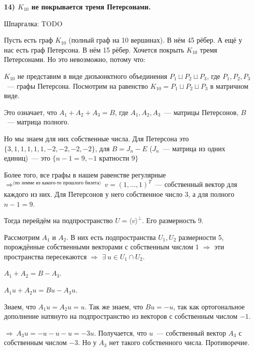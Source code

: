 {\bf 14) $K_{10}$ не покрывается тремя Петерсонами.}

Шпаргалка: TODO

Пусть есть граф $K_{10}$ (полный граф на 10 вершинах). В нём 45 рёбер. А ещё у нас есть граф Петерсона. В нём 15 рёбер. Хочется покрыть $K_{10}$ тремя Петерсонами. Но это невозможно, потому что:

\thrm $K_{10}$ не представим в виде дизъюнктного объединения $P_1\sqcup P_2\sqcup P_3$, где $P_1, P_2, P_3$~--- графы Петерсона.
	\proof
	Посмотрим на равенство $K_{10} = P_1 \sqcup P_2\sqcup P_3$ в матричном виде.

	Это означает, что $A_1 + A_2 + A_3 = B$, где $A_1, A_2, A_3$~--- матрицы Петерсонов, $B$~--- матрица полного.

	Но мы знаем для них собственные числа. Для Петерсона это $\{3, 1, 1, 1, 1, 1, -2, -2, -2, -2\}$, для $B = J_n - E$ ($J_n$~--- матрица из одних единиц)~--- это $\{n - 1 = 9, -1\text{ кратности 9}\}$

	Более того, все графы в нашем равенстве регулярные $\Rightarrow^{\text{(по лемме из какого-то прошлого билета)}}\ v=(1,\ldots, 1)^T$~--- собственный вектор для каждого из них. Для Петерсонов у него собственное число $3$, а для полного $n - 1 = 9$. 

	Тогда перейдём на подпространство $U = \langle v\rangle^{\perp}$. Его размерность 9.

	Рассмотрим $A_1$ и $A_2$. В них есть подпространства $U_1, U_2$ размерности 5, порождённые собственными векторами с собственным числом $1$ $\Rightarrow$ эти пространства пересекаются $\Rightarrow$ $\exists\ u\in U_1 \cap U_2$.

	$A_1 + A_2 = B - A_3$.

	$A_1u + A_2u = Bu - A_3u$.

	Знаем, что $A_1u = A_2u = u$. Так же знаем, что $Bu = -u$, так как ортогональное дополнение натянуто на подпространство из векторов с собственным числом $-1$.

	$\Rightarrow\ A_3u = -u-u-u = -3u$. Получается, что $u$~--- собственный вектор $A_3$ с собственным числом $-3$. Но у $A_3$ нет такого собственного числа. Противоречие. 
\endproof
\ethrm 